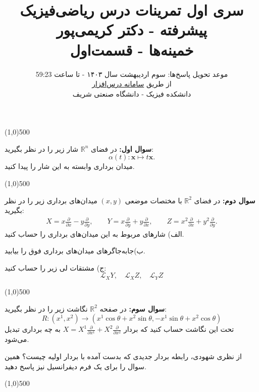 \documentclass{article}
\title{ سری اول تمرینات درس ریاضی‌فیزیک پیشرفته - دکتر کریمی‌پور
\\
\vspace{-1em}
خمینه‌ها - قسمت‌اول
}
\author{موعد تحویل پاسخ‌ها:
 سوم اردیبهشت سال ۱۴۰۳ - تا ساعت 59:23
 \\
 از طریق 
 \href{https://cw.sharif.edu/}{سامانه درس‌افزار}
\\
دانشکده فیزیک - دانشگاه صنعتی شریف
}\date{}
\newcommand{\pardev}[2]{
	\frac{\partial #1}{\partial #2}
}
\begin{document}
	\maketitle
	
	\def\lo{\longrightarrow}
	\def\endline{		{
			\vspace{-2.5em}
			\color{cyan}
			\begin{center} \linethickness{1mm}\line(1,0){500} \end{center}
	}}
\def\thinendline{		{
		\vspace{-2.5em}
		\color{purple}
		\begin{center} \linethickness{0.5mm}\line(1,0){500} \end{center}
}}

		\endline
		
		\noindent
		\textbf{سوال اول:}
		در فضای 
		$\mathbb{R}^n$
		شار زیر را در نظر بگیرید:
		\[
		\alpha(t) : \mathbf{x} \longmapsto t\mathbf{x}.
		\]
		میدان برداری وابسته به این شار را پیدا کنید.
		
		\endline
		
		\noindent
		\textbf{سوال دوم:}
		در فضای 
		$\mathbb{R}^2$
		 با مختصات موضعی 
		 $(x,y)$
		 میدان‌های برداری زیر را در نظر بگیرید:
		 \begin{equation*}
		 	\begin{aligned}
		 		X = x\pardev{}{x} - y\pardev{}{y},\quad\quad
		 		Y = x\pardev{}{y} + y\pardev{}{x},\quad\quad 
		 		Z = x^2\pardev{}{x} + y^2\pardev{}{y}. 
		 	\end{aligned}
		 \end{equation*}
		 الف) شارهای مربوط به این میدان‌های برداری را حساب کنید.
		 
		 \noindent
		 ب)جابه‌جاگرهای میدان‌های برداری فوق را بیابید.
		 
		 \noindent
		 ج) مشتقات لی زیر را حساب کنید:
		 \[
		 \mathcal{L}_XY,\quad \mathcal{L}_XZ, \quad \mathcal{L}_YZ
		 \]
		
		\endline
		
		
\noindent
\textbf{سوال سوم:}
در صفحه 
$\mathbb{R}^2$
نگاشت زیر را در نظر بگیرید:
\[
R: (x^1,x^2) \lo (x^1\cos\theta + x^2\sin\theta, -x^1\sin\theta + x^2\cos\theta)
\]
تحت این نگاشت حساب کنید که بردار 
$X = X^1 \pardev{}{x^1} + X^2\pardev{}{x^2}$
به چه برداری تبدیل می‌شود. 

\noindent
از نظری شهودی، رابطه بردار جدیدی که بدست آمده با بردار اولیه چیست؟ همین سوال را برای یک فرم دیفرانسیل نیز پاسخ دهید.

	\endline
				
\end{document}
